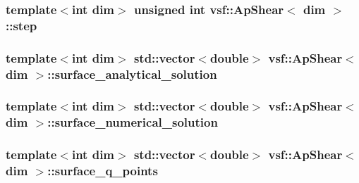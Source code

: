\hypertarget{classvsf_1_1ApShear_aa8a20bee076f8edea5090fe587af2630}{
\subsubsection[{step}]{\setlength{\rightskip}{0pt plus 5cm}template$<$int dim$>$ unsigned int {\bf vsf\-::\-Ap\-Shear}$<$ dim $>$\-::step\hspace{0.3cm}{\ttfamily [private]}}}\label{classvsf_1_1ApShear_aa8a20bee076f8edea5090fe587af2630}
\hypertarget{classvsf_1_1ApShear_a96a76f66c7155491bfe3d3c50d576fe9}{
\subsubsection[{surface\-\_\-analytical\-\_\-solution}]{\setlength{\rightskip}{0pt plus 5cm}template$<$int dim$>$ std\-::vector$<$double$>$ {\bf vsf\-::\-Ap\-Shear}$<$ dim $>$\-::surface\-\_\-analytical\-\_\-solution\hspace{0.3cm}{\ttfamily [private]}}}\label{classvsf_1_1ApShear_a96a76f66c7155491bfe3d3c50d576fe9}
\hypertarget{classvsf_1_1ApShear_adbc4b0f8e2a3282b27241a2088f9717d}{
\subsubsection[{surface\-\_\-numerical\-\_\-solution}]{\setlength{\rightskip}{0pt plus 5cm}template$<$int dim$>$ std\-::vector$<$double$>$ {\bf vsf\-::\-Ap\-Shear}$<$ dim $>$\-::surface\-\_\-numerical\-\_\-solution\hspace{0.3cm}{\ttfamily [private]}}}\label{classvsf_1_1ApShear_adbc4b0f8e2a3282b27241a2088f9717d}
\hypertarget{classvsf_1_1ApShear_a9aec407d8269d51336f50f3a9d94b53b}{
\subsubsection[{surface\-\_\-q\-\_\-points}]{\setlength{\rightskip}{0pt plus 5cm}template$<$int dim$>$ std\-::vector$<$double$>$ {\bf vsf\-::\-Ap\-Shear}$<$ dim $>$\-::surface\-\_\-q\-\_\-points\hspace{0.3cm}{\ttfamily [private]}}}\label{classvsf_1_1ApShear_a9aec407d8269d51336f50f3a9d94b53b}
